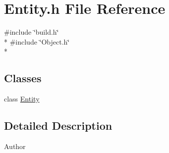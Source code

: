 \section{Entity.\-h File Reference}
\label{_entity_8h}
{\ttfamily \#include \char`\"{}build.\-h\char`\"{}}\\*
{\ttfamily \#include \char`\"{}Object.\-h\char`\"{}}\\*
\subsection*{Classes}
\begin{DoxyCompactItemize}
\item 
class \hyperlink{class_entity}{Entity}
\end{DoxyCompactItemize}


\subsection{Detailed Description}
\begin{DoxyAuthor}{Author}

\end{DoxyAuthor}
